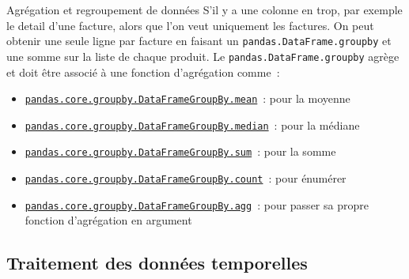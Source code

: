 \documentclass{beamer}
\begin{document}
    \begin{frame}{Agrégation et regroupement de données}
        S'il y a une colonne en trop, par exemple le detail d'une facture, alors que l'on veut uniquement les factures.
        On peut obtenir une seule ligne par facture en faisant un \lstinline{pandas.DataFrame.groupby} et une somme sur la liste de chaque produit.
        \bigbreak
        Le \lstinline{pandas.DataFrame.groupby} agrège et doit être associé à une fonction d'agrégation comme~:
        \begin{itemize}
            \item \href{https://pandas.pydata.org/docs/reference/api/pandas.core.groupby.DataFrameGroupBy.mean.html\#pandas.core.groupby.DataFrameGroupBy.mean}{\lstinline{pandas.core.groupby.DataFrameGroupBy.mean}}~: pour la moyenne
            \item \href{https://pandas.pydata.org/docs/reference/api/pandas.core.groupby.DataFrameGroupBy.median.html\#pandas.core.groupby.DataFrameGroupBy.median}{\lstinline{pandas.core.groupby.DataFrameGroupBy.median}}~: pour la médiane
            \item \href{https://pandas.pydata.org/docs/reference/api/pandas.core.groupby.DataFrameGroupBy.sum.html\#pandas.core.groupby.DataFrameGroupBy.sum}{\lstinline{pandas.core.groupby.DataFrameGroupBy.sum}}~: pour la somme
            \item \href{https://pandas.pydata.org/docs/reference/api/pandas.core.groupby.DataFrameGroupBy.count.html\#pandas.core.groupby.DataFrameGroupBy.count}{\lstinline{pandas.core.groupby.DataFrameGroupBy.count}}~: pour énumérer
            \item \href{https://pandas.pydata.org/docs/reference/api/pandas.core.groupby.DataFrameGroupBy.agg.html\#pandas.core.groupby.DataFrameGroupBy.agg}{\lstinline{pandas.core.groupby.DataFrameGroupBy.agg}}~: pour passer sa propre fonction d'agrégation en argument
        \end{itemize}
    \end{frame}

    \subsection{Traitement des données temporelles}
\end{document}
